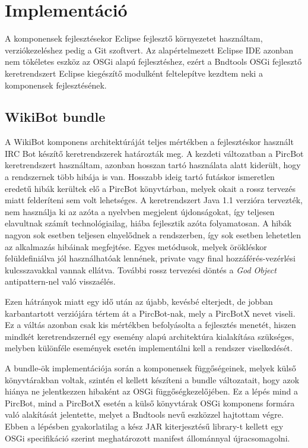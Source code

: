 \chapter{Implementáció}
\label{cha:implementation}

A komponensek fejlesztésekor Eclipse fejlesztő környezetet használtam, verziókezeléshez pedig a Git szoftvert. Az alapértelmezett Eclipse IDE azonban nem tökéletes eszköz az OSGi alapú fejlesztéshez, ezért a Bndtools \cite{bndtools} OSGi fejlesztő keretrendszert Eclipse kiegészítő modulként feltelepítve kezdtem neki a komponensek fejlesztésének.

\section{WikiBot bundle}
\label{sec:wikibotbundle}

A WikiBot komponens architektúráját teljes mértékben a fejlesztéskor használt IRC Bot készítő keretrendszerek határozták meg. A kezdeti változatban a PircBot \cite{pircbot} keretrendszert használtam, azonban hosszan tartó használata alatt kiderült, hogy a rendszernek több hibája is van. Hosszabb ideig tartó futáskor ismeretlen eredetű hibák kerültek elő a PircBot könyvtárban, melyek okait a rossz tervezés miatt felderíteni sem volt lehetséges. A keretrendszert Java 1.1 verzióra tervezték, nem használja ki az azóta a nyelvben megjelent újdonságokat, így teljesen elavultnak számít technológiailag, hiába fejlesztik azóta folyamatosan. A hibák nagyon sok esetben teljesen elnyelődnek a rendszerben, így sok esetben lehetetlen az alkalmazás hibáinak megfejtése. Egyes metódusok, melyek örökléskor felüldefiniálva jól használhatóak lennének, private vagy final hozzáférés-vezérlési kulcsszavakkal vannak ellátva. További rossz tervezési döntés a \textit{God Object} antipattern-nel való visszaélés.

Ezen hátrányok miatt egy idő után az újabb, kevésbé elterjedt, de jobban karbantartott verziójára tértem át a PircBot-nak, mely a PircBotX \cite{pircbotx} nevet viseli. Ez a váltás azonban csak kis mértékben befolyásolta a fejlesztés menetét, hiszen mindkét keretrendszernél egy esemény alapú architektúra kialakítása szükséges, melyben különféle események esetén implementálni kell a rendszer viselkedését.

A bundle-ök implementációja során a komponensek függőségeinek, melyek külső könyvtárakban voltak, szintén el kellett készíteni a bundle változatait, hogy azok hiánya ne jelentkezzen hibaként az OSGi függőségkezelőjében. Ez a lépés mind a PircBot, mind a PircBotX esetén a külső könyvtárak OSGi komponens formára való alakítását jelentette, melyet a Bndtools nevű eszközzel hajtottam végre. Ebben a lépésben gyakorlatilag a kész JAR kiterjesztésű library-t kellett egy OSGi specifikáció szerint meghatározott manifest állománnyal újracsomagolni.

